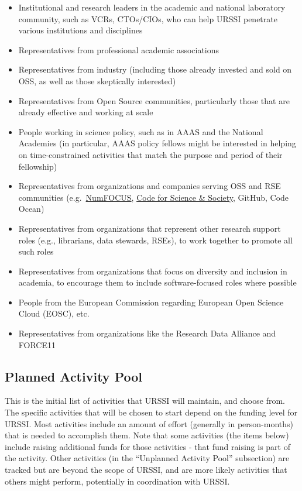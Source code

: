 \documentclass[
]{book}
\begin{document}
\begin{itemize}
\item
  Institutional and research leaders in the academic and national laboratory community, such as
  VCRs, CTOs/CIOs, who can help URSSI penetrate various institutions and disciplines
\item
  Representatives from professional academic associations
\item
  Representatives from industry (including those already invested and sold on OSS, as well as
  those skeptically interested)
\item
  Representatives from Open Source communities, particularly those that are already effective and working at scale
\item
  People working in science policy, such as in AAAS and the National Academies (in particular, AAAS policy fellows might be interested in helping on time-constrained activities that match the purpose and period of their fellowship)
\item
  Representatives from organizations and companies serving OSS and RSE communities
  (e.g.~\href{https://numfocus.org}{NumFOCUS}, \href{https://codeforscience.org}{Code for Science \& Society}, GitHub, Code Ocean)
\item
  Representatives from organizations that represent other research support roles
  (e.g., librarians, data stewards, RSEs), to work together to promote all such roles
\item
  Representatives from organizations that focus on diversity and inclusion in academia,
  to encourage them to include software-focused roles where possible
\item
  People from the European Commission regarding European Open Science Cloud (EOSC), etc.
\item
  Representatives from organizations like the Research Data Alliance and FORCE11
\end{itemize}

\hypertarget{planned-activity-pool}{%
\subsection{Planned Activity Pool}\label{planned-activity-pool}}

This is the initial list of activities that URSSI will maintain, and choose from. The specific
activities that will be chosen to start depend on the funding level for URSSI. Most activities
include an amount of effort (generally in person-months) that is needed to accomplish them.
Note that some activities (the items below) include
raising additional funds for those activities - that fund raising is part of the activity. Other
activities (in the ``Unplanned Activity Pool'' subsection) are tracked but are beyond the scope of URSSI, and are more
likely activities that others might perform, potentially in coordination with URSSI.
\end{document}
